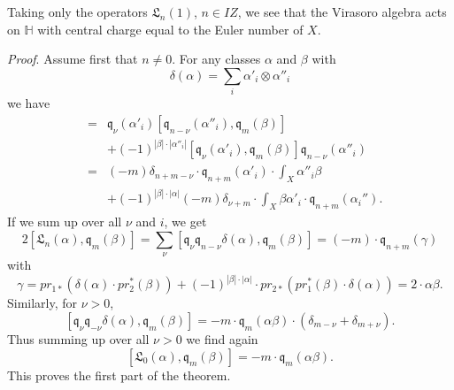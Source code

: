 \documentclass[twoside,11pt]{article}
\newcommand{\prf}{{\kursiv Proof}. }
\newcommand{\kursiv}{\sl}
\newcommand{\IH}{{\mathbb H}}
\newcommand{\gothq}{{\mathfrak q}}
\newcommand{\gothL}{{\mathfrak L}}
\newcommand{\tensor}{\otimes}
\newcommand{\qq}{\gothq}
\newcommand{\LL}{\gothL}
\begin{document}
Taking only the operators $\LL_n(1)$, $n\in IZ$, we see that the Virasoro 
algebra acts on $\IH$ with central charge equal to the Euler number of $X$.

\prf Assume first that $n\neq 0$. For any classes $\alpha$ and $\beta$ with 
$$\delta(\alpha)=\sum_i\alpha'_i\tensor\alpha''_i$$
we have
\begin{eqnarray*}
[\qq_\nu(\alpha'_i)\qq_{n-\nu}(\alpha''_i),\qq_m(\beta)]&=&
\qq_\nu(\alpha'_i)[\qq_{n-\nu}(\alpha''_i),\qq_m(\beta)]\\
&&+(-1)^{|\beta|\cdot|\alpha''_i|}[\qq_\nu(\alpha'_i),\qq_m(\beta)]
\qq_{n-\nu}(\alpha''_i)\\
&=&(-m)\delta_{n+m-\nu}\cdot\qq_{n+m}(\alpha'_i)\cdot\int_X\alpha''_i\beta\\
&&+(-1)^{|\beta|\cdot|\alpha|}(-m)\delta_{\nu+m}\cdot\int_X\beta\alpha'_i\cdot\qq_{n+m}(\alpha_i'').
\end{eqnarray*}
If we sum up over all $\nu$ and $i$, we get
$$2[\LL_n(\alpha),\qq_m(\beta)]=\sum_{\nu}
[\qq_\nu\qq_{n-\nu}\delta(\alpha),\qq_m(\beta)]=(-m)\cdot\qq_{n+m}(\gamma)
$$
with
$$\gamma=pr_{1*}(\delta(\alpha)\cdot pr_2^*(\beta))+(-1)^{|\beta|\cdot|\alpha|}
\cdot pr_{2*}(pr_1^*(\beta)\cdot\delta(\alpha))=2\cdot \alpha\beta.$$
Similarly, for $\nu>0$,
$$
[\qq_{\nu}\qq_{-\nu}\delta(\alpha),\qq_m(\beta)]=-m\cdot\qq_m(\alpha\beta)\cdot
(\delta_{m-\nu}+\delta_{m+\nu}).$$
Thus summing up over all $\nu>0$ we find again 
$$[\LL_0(\alpha),\qq_m(\beta)]=-m\cdot \qq_m(\alpha\beta).$$
This proves the first part of the theorem. 
\end{document}
